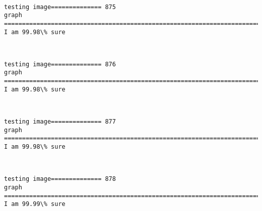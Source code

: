 \documentclass[11pt]{article}
\begin{document}
    \begin{center}
    \end{center}
    { \hspace*{\fill} \\}
    
    \begin{Verbatim}[commandchars=\\\{\}]
testing image============== 875
graph
============================================================================
I am 99.98\% sure

    \end{Verbatim}

    \begin{center}
    \end{center}
    { \hspace*{\fill} \\}
    
    \begin{Verbatim}[commandchars=\\\{\}]
testing image============== 876
graph
============================================================================
I am 99.98\% sure

    \end{Verbatim}

    \begin{center}
    \end{center}
    { \hspace*{\fill} \\}
    
    \begin{Verbatim}[commandchars=\\\{\}]
testing image============== 877
graph
============================================================================
I am 99.98\% sure

    \end{Verbatim}

    \begin{center}
    \end{center}
    { \hspace*{\fill} \\}
    
    \begin{Verbatim}[commandchars=\\\{\}]
testing image============== 878
graph
============================================================================
I am 99.99\% sure

    \end{Verbatim}
\end{document}
